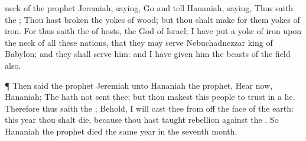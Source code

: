 {neck of the
prophet
Jeremiah,
saying,
Go and
tell
Hananiah,
saying, Thus
saith the
{}; Thou hast
broken the
yokes of
wood; but thou shalt
make for them
yokes of
iron.
For thus
saith the
{} of
hosts, the
God of
Israel; I have
put a
yoke of
iron upon the
neck of all these
nations, that they may
serve
Nebuchadnezzar
king of
Babylon; and they shall
serve him: and I have
given him the
beasts of the
field also.
\par }{\PP {}¶ Then
said the
prophet
Jeremiah unto
Hananiah the
prophet,
Hear now,
Hananiah; The
{} hath not
sent thee; but thou makest this
people to
trust in a
lie.
Therefore thus
saith the
{}; Behold, I will
cast thee from off the
face of the
earth: this
year thou shalt
die, because thou hast
taught
rebellion against the
{}.
So
Hananiah the
prophet
died the same
year in the
seventh
month.

}
